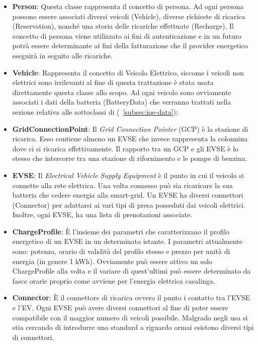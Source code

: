\begin{itemize}
	\item \textbf{Person}: Questa classe rappresenta il concetto di persona. Ad ogni persona possono essere associati diversi veicoli (Vehicle), diverse richieste di ricarica (Reservation), nonché una storia delle ricariche effettuate (Recharge). Il concetto di persona viene utilizzato ai fini di autenticazione e in un futuro potrà essere determinante ai fini della fatturazione che il provider energetico eseguirà in seguito alle ricariche.
	\item \textbf{Vehicle}: Rappresenta il concetto di Veicolo Elettrico, siccome i veicoli non elettrici sono irrilevanti al fine di questa trattazione è stata usata direttamente questa classe allo scopo. Ad ogni veicolo sono ovviamente associati i dati della batteria (BatteryData) che verranno trattati nella sezione relativa alle sottoclassi di  (~\ref{subsec:ioe-data});
	\item \textbf{GridConnectionPoint}: Il \emph{Grid Connection Pointer} (GCP) è la stazione di ricarica. Esso contiene almeno un EVSE che invece rappresenta la colonnina dove ci si ricarica effettivamente. Il rapporto tra un GCP e gli EVSE è lo stesso che intercorre tra una stazione di rifornimento e le pompe di benzina. 
	\item \textbf{EVSE}: Il \emph{Electrical Vehicle Supply Equipment} è il punto in cui il veicolo si connette alla rete elettrica. Una volta connesso può sia ricaricare la sua batteria che cedere energia alla smart-grid. Un EVSE ha diversi connettori (Connector) per adattarsi ai vari tipi di presa posseduti dai veicoli elettrici. Inoltre, ogni EVSE, ha una lista di prenotazioni associate.
	\item \textbf{ChargeProfile}: È l'insieme dei parametri che caratterizzano il profilo energetico di un EVSE in un determinato istante. I parametri attualmente sono: potenza, orario di validità del profilo stesso e prezzo per unità di energia (in genere 1 kWh). Ovviamente può essere attivo un solo ChargeProfile alla volta e il variare di quest'ultimi può essere determinato da fasce orarie proprio come avviene per l'energia elettrica casalinga.
	\item \textbf{Connector}: È il connettore di ricarica ovvero il punto i contatto tra l'EVSE e l'EV. Ogni EVSE può avere diversi connettori al fine di poter essere compatibile con il maggior numero di veicoli possibile. Malgrado negli usa si stia cercando di introdurre uno standard a riguardo ormai esistono diversi tipi di connettori. 

\end{itemize}
